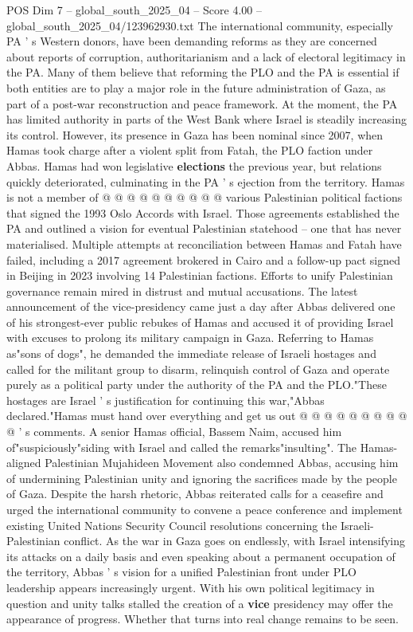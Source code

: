\begin{textsample}{POS Dim 7 – global\_south\_2025\_04 – Score 4.00 – global\_south\_2025\_04/123962930.txt}
The international community, especially PA ' s Western donors, have been demanding reforms as they are concerned about reports of corruption, authoritarianism and a lack of electoral legitimacy in the PA.
Many of them believe that reforming the PLO and the PA is essential if both entities are to play a major role in the future administration of Gaza, as part of a post-war reconstruction and peace framework.
At the moment, the PA has limited authority in parts of the West Bank where Israel is steadily increasing its control.
However, its presence in Gaza has been nominal since 2007, when Hamas took charge after a violent split from Fatah, the PLO faction under Abbas.
Hamas had won legislative \textbf{elections} the previous year, but relations quickly deteriorated, culminating in the PA ' s ejection from the territory.
Hamas is not a member of @ @ @ @ @ @ @ @ @ @ various Palestinian political factions that signed the 1993 Oslo Accords with Israel.
Those agreements established the PA and outlined a vision for eventual Palestinian statehood -- one that has never materialised.
Multiple attempts at reconciliation between Hamas and Fatah have failed, including a 2017 agreement brokered in Cairo and a follow-up pact signed in Beijing in 2023 involving 14 Palestinian factions.
Efforts to unify Palestinian governance remain mired in distrust and mutual accusations.
The latest announcement of the vice-presidency came just a day after Abbas delivered one of his strongest-ever public rebukes of Hamas and accused it of providing Israel with excuses to prolong its military campaign in Gaza.
Referring to Hamas as"sons of dogs", he demanded the immediate release of Israeli hostages and called for the militant group to disarm, relinquish control of Gaza and operate purely as a political party under the authority of the PA and the PLO."These hostages are Israel ' s justification for continuing this war,"Abbas declared."Hamas must hand over everything and get us out @ @ @ @ @ @ @ @ @ @ ' s comments.
A senior Hamas official, Bassem Naim, accused him of"suspiciously"siding with Israel and called the remarks"insulting".
The Hamas-aligned Palestinian Mujahideen Movement also condemned Abbas, accusing him of undermining Palestinian unity and ignoring the sacrifices made by the people of Gaza.
Despite the harsh rhetoric, Abbas reiterated calls for a ceasefire and urged the international community to convene a peace conference and implement existing United Nations Security Council resolutions concerning the Israeli-Palestinian conflict.
As the war in Gaza goes on endlessly, with Israel intensifying its attacks on a daily basis and even speaking about a permanent occupation of the territory, Abbas ' s vision for a unified Palestinian front under PLO leadership appears increasingly urgent.
With his own political legitimacy in question and unity talks stalled the creation of a \textbf{vice} presidency may offer the appearance of progress.
Whether that turns into real change remains to be seen.

\end{textsample}
